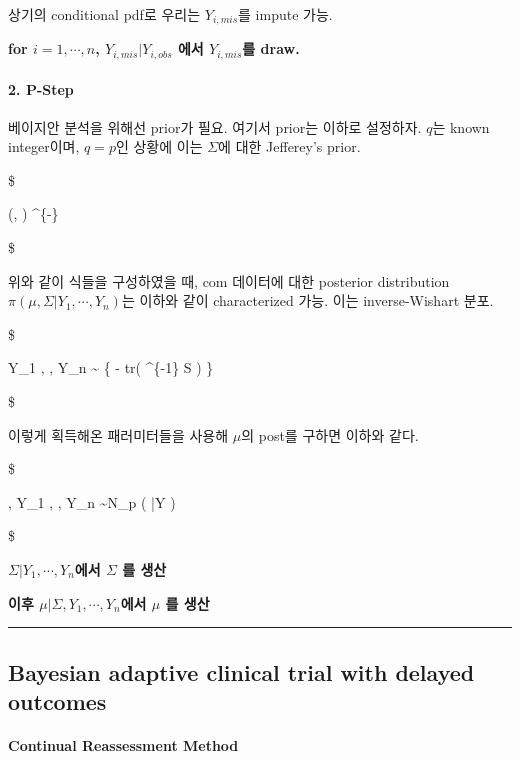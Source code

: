 \documentclass[
]{book}
\begin{document}
상기의 conditional pdf로 우리는 \(Y_{i, mis}\)를 impute 가능.

\textbf{for \(i=1, \cdots, n\), \(Y_{i, mis} \vert Y_{i, obs}\) 에서 \(Y_{i, mis}\)를 draw.}

\hypertarget{p-step}{%
\paragraph{2. P-Step}\label{p-step}}

베이지안 분석을 위해선 prior가 필요. 여기서 prior는 이하로 설정하자. \(q\)는 known integer이며, \(q=p\)인 상황에 이는 \(\Sigma\)에 대한 Jefferey's prior.

\$

\pi (\mu, \Sigma) \propto \vert \Sigma \vert\^{}\{-\}

\$

위와 같이 식들을 구성하였을 때, com 데이터에 대한 posterior distribution \(\pi(\mu, \Sigma \vert Y_1 , \cdots, Y_n)\)는 이하와 같이 characterized 가능. 이는 inverse-Wishart 분포.

\$

\Sigma \vert Y\_1 , \cdots, Y\_n \sim {} \exp \left\{ - tr\left( \Sigma\^{}\{-1\} S \right) \right\}

\$

이렇게 획득해온 패러미터들을 사용해 \(\mu\)의 post를 구하면 이하와 같다.

\$

\mu \vert \Sigma, Y\_1 , \cdots, Y\_n \sim N\_p \left( \bar Y  \Sigma \right)

\$

\textbf{\(\Sigma \vert Y_1 , \cdots, Y_n\)에서 \(\Sigma\) 를 생산}

\textbf{이후 \(\mu \vert \Sigma, Y_1 , \cdots, Y_n\)에서 \(\mu\) 를 생산}

\begin{center}\rule{0.5\linewidth}{0.5pt}\end{center}

\hypertarget{bayesian-adaptive-clinical-trial-with-delayed-outcomes}{%
\subsection{Bayesian adaptive clinical trial with delayed outcomes}\label{bayesian-adaptive-clinical-trial-with-delayed-outcomes}}

\hypertarget{continual-reassessment-method}{%
\paragraph{Continual Reassessment Method}\label{continual-reassessment-method}}
\end{document}
